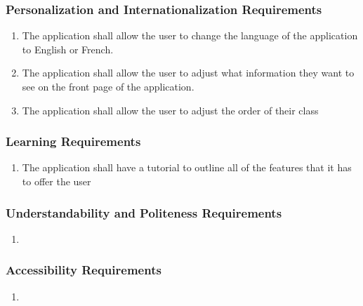 \documentclass[]{article}
\begin{document}
\subsubsection{Personalization and Internationalization Requirements}
\label{ssub:personalization_and_internationalization_requirements}
\begin{enumerate}[{UH}1. ]
	\item The application shall allow the user to change the language of the 
application to English or French.
	\item The application shall allow the user to adjust what information they want to see on 
the front page of the application.
	\item The application shall allow the user to adjust the order of their class
\end{enumerate}

\subsubsection{Learning Requirements}
\label{ssub:learning_requirements}
\begin{enumerate}[{UH}1. ]
		\item The application shall have a tutorial to outline all of the features 
that it has to offer the user
\end{enumerate}

\subsubsection{Understandability and Politeness Requirements}
\label{ssub:understandability_and_politeness_requirements}
\begin{enumerate}[{UH}1. ]
	\item
\end{enumerate}

\subsubsection{Accessibility Requirements}
\label{ssub:accessibility_requirements}
\begin{enumerate}[{UH}1. ]
	\item
\end{enumerate}

\end{document}
